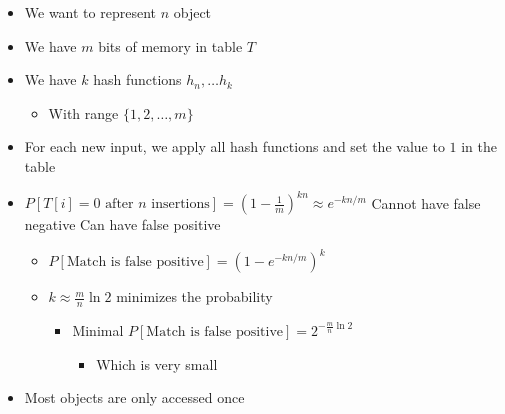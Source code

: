 \begin{itemize}
\begin{itemize}
\begin{itemize}
\begin{itemize}
                        \end{itemize}
                \end{itemize}
                \begin{itemize}
                    \item We want to represent $n$ object
                    \item We have $m$ bits of memory in table $T$
                    \item We have $k$ hash functions $h_n, \dots h_k$
                        \begin{itemize}
                            \item With range $\{1, 2, \dots, m\}$
                        \end{itemize}
                    \item For each new input, we apply all hash functions and set the value to $1$ in the table
                    \item $P[T[i] = 0 \text{ after } n \text{ insertions}] = \left( 1 - \frac{1}{m} \right)^{kn} \approx e^{-kn/m}$
                        \ipro Cannot have false negative
                        \icon Can have false positive
                            \begin{itemize}
                                \item $P[\text{Match is false positive}] = (1 - e^{-kn / m})^k$
                                \item $k \approx \frac{m}{n} \ln 2$ minimizes the probability
                                    \begin{itemize}
                                        \item Minimal $P[\text{Match is false positive}] = 2^{-\frac{m}{n} \ln 2}$
                                            \begin{itemize}
                                                \item Which is very small
                                            \end{itemize}
                                    \end{itemize}
                            \end{itemize}
                \end{itemize}
                \begin{itemize}
                    \item Most objects are only accessed once

\end{itemize}
\end{itemize}
\end{itemize}
